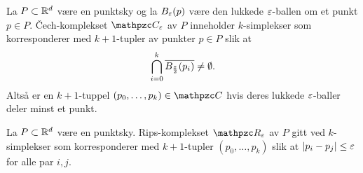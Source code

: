 \begin{definisjon}\label{def:CechKomp}
  La $P\subset\mathbb{R}^d$ være en punktsky og la $B_\varepsilon(p)$ være den
  lukkede $\varepsilon$-ballen om et punkt $p\in P$. Čech-komplekset
  $\Cpzc_\eps$ av $P$ inneholder $k$-simplekser som korresponderer
  med $k+1$-tupler av punkter $p\in P$ slik at
  \[\bigcap_{i=0}^k \overline{B_\frac{\varepsilon}{2}(p_i)}\neq\emptyset.\]
  Altså er en $k+1$-tuppel $(p_0,\dots,p_k)\in\Cpzc$ hvis deres
  lukkede $\varepsilon$-baller deler minst et punkt.
\end{definisjon}

\begin{definisjon}\label{def:RipsKomp}
  La $P\subset\mathbb{R}^d$ være en punktsky. Rips-komplekset
  $\Rpzc_\eps$ av $P$ gitt ved $k$-simplekser som korresponderer
  med $k+1$-tupler $(p_0,\dots,p_k)$ slik at $|p_i-p_j|\leq\varepsilon$
  for alle par $i,j$.
\end{definisjon}


